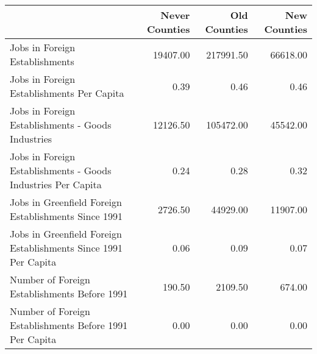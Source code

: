 \begin{table}
\centering
\begin{tabular}[t]{lrrr}
\toprule
  & Never Counties & Old Counties & New Counties\\
\midrule
Jobs in Foreign Establishments & 19407.00 & 217991.50 & 66618.00\\
Jobs in Foreign Establishments Per Capita & 0.39 & 0.46 & 0.46\\
Jobs in Foreign Establishments - Goods Industries & 12126.50 & 105472.00 & 45542.00\\
Jobs in Foreign Establishments - Goods Industries Per Capita & 0.24 & 0.28 & 0.32\\
Jobs in Greenfield Foreign Establishments Since 1991 & 2726.50 & 44929.00 & 11907.00\\
Jobs in Greenfield Foreign Establishments Since 1991 Per Capita & 0.06 & 0.09 & 0.07\\
Number of Foreign Establishments Before 1991 & 190.50 & 2109.50 & 674.00\\
Number of Foreign Establishments Before 1991 Per Capita & 0.00 & 0.00 & 0.00\\
\bottomrule
\end{tabular}
\end{table}
